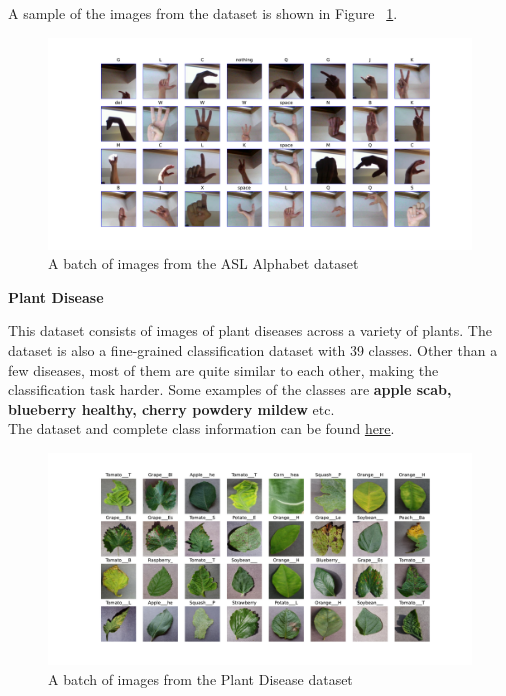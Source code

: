 A sample of the images from the dataset is shown in Figure ~\ref{fig:asl}.
\begin{figure}[!htb]
    \centering
    \includegraphics[width=1\textwidth]{images/asl.pdf}
    \caption{A batch of images from the ASL Alphabet dataset}
    \label{fig:asl}

\end{figure}

\textbf{Plant Disease}

This dataset consists of images of plant diseases across a variety of plants. The dataset is also a fine-grained classification dataset with 39 classes. Other than a few diseases, most of them are quite similar to each other, making the classification task harder. Some examples of the classes are \textbf{apple scab, blueberry healthy, cherry powdery mildew} etc.\\
The dataset and complete class information can be found \href{https://www.kaggle.com/datasets/rajibdpi/plant-disease-dataset}{here}.
\begin{figure}[!htb]
    \centering
    \includegraphics[width=1\textwidth]{images/plantdisease.pdf}
    \caption{A batch of images from the Plant Disease dataset}
    \label{fig:plant}

\end{figure}

